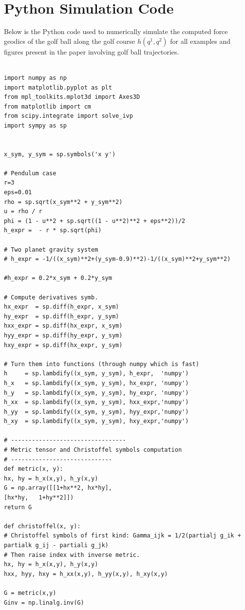 \appendix

\section{Python Simulation Code}

Below is the Python code used to numerically simulate the computed force geodics of the golf ball along the golf course $h(q^1,q^2)$ for all examples and figures present in the paper involving golf ball trajectories.

\begin{lstlisting}
	
import numpy as np
import matplotlib.pyplot as plt
from mpl_toolkits.mplot3d import Axes3D
from matplotlib import cm
from scipy.integrate import solve_ivp
import sympy as sp


x_sym, y_sym = sp.symbols('x y')

# Pendulum case
r=3
eps=0.01
rho = sp.sqrt(x_sym**2 + y_sym**2)
u = rho / r
phi = (1 - u**2 + sp.sqrt((1 - u**2)**2 + eps**2))/2
h_expr =  - r * sp.sqrt(phi)

# Two planet gravity system
# h_expr = -1/((x_sym)**2+(y_sym-0.9)**2)-1/((x_sym)**2+y_sym**2)

#h_expr = 0.2*x_sym + 0.2*y_sym

# Compute derivatives symb.
hx_expr  = sp.diff(h_expr, x_sym)
hy_expr  = sp.diff(h_expr, y_sym)
hxx_expr = sp.diff(hx_expr, x_sym)
hyy_expr = sp.diff(hy_expr, y_sym)
hxy_expr = sp.diff(hx_expr, y_sym)

# Turn them into functions (through numpy which is fast)
h     = sp.lambdify((x_sym, y_sym), h_expr,  'numpy')
h_x   = sp.lambdify((x_sym, y_sym), hx_expr, 'numpy')
h_y   = sp.lambdify((x_sym, y_sym), hy_expr, 'numpy')
h_xx  = sp.lambdify((x_sym, y_sym), hxx_expr,'numpy')
h_yy  = sp.lambdify((x_sym, y_sym), hyy_expr,'numpy')
h_xy  = sp.lambdify((x_sym, y_sym), hxy_expr,'numpy')

# ---------------------------------
# Metric tensor and Christoffel symbols computation
# -----------------------------
def metric(x, y):
hx, hy = h_x(x,y), h_y(x,y)
G = np.array([[1+hx**2, hx*hy],
[hx*hy,   1+hy**2]])
return G

def christoffel(x, y):
# Christoffel symbols of first kind: Gamma_ijk = 1/2(partialj g_ik + partialk g_ij - partiali g_jk)
# Then raise index with inverse metric.
hx, hy = h_x(x,y), h_y(x,y)
hxx, hyy, hxy = h_xx(x,y), h_yy(x,y), h_xy(x,y)

G = metric(x,y)
Ginv = np.linalg.inv(G)


\end{lstlisting}
